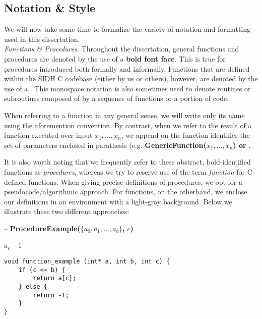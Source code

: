 \subsection{Notation \& Style}

We will now take some time to formalize the variety of notation and formatting used in this dissertation.\\

\noindent
\textit{Functions \& Procedures}. Throughout the dissertation, general functions and procedures are denoted by the use of a \textbf{bold font face}. This is true for procedures introduced both formally and informally. Functions that are defined within the SIDH C codebase (either by us or others), however, are denoted by the use of a . This monospace notation is also sometimes used to denote routines or subroutines composed of by a sequence of functions or a portion of code. 

When referring to a function in any general sense, we will write only its name using the aforemention convention. By contrast, when we refer to the result of a function executed over input $x_{1}, ..., x_{n}$, we append on the function identifier the set of parameters enclosed in parathesis (e.g. \textbf{GenericFunction($x_{1}, ..., x_{n}$) or }. 

It is also worth noting that we frequently refer to these abstract, bold-identified functions as \textit{procedures}, whereas we try to reserve use of the term \textit{function} for C-defined functions. When giving precise definitions of procedures, we opt for a pseudocode/algorithmic approach. For functions, on the otherhand, we enclose our definitions in an environment with a light-gray background. Below we illustrate these two different approaches:\\

\begin{algorithm}
\caption{-- \textbf{ProcedureExample($\{a_0, a_1, ... , a_b\}$, $c$)}}\label{alg:procedureexample}
\begin{algorithmic}[1]
	\State \Return $a_c$
\Else
	\State \Return $-1$
\EndIf
\end{algorithmic}
\end{algorithm}

\label{code:pbinv}
\begin{lstlisting}
void function_example (int* a, int b, int c) {
	if (c <= b) {
		return a[c];
	} else {
		return -1;
	}
}
\end{lstlisting}

